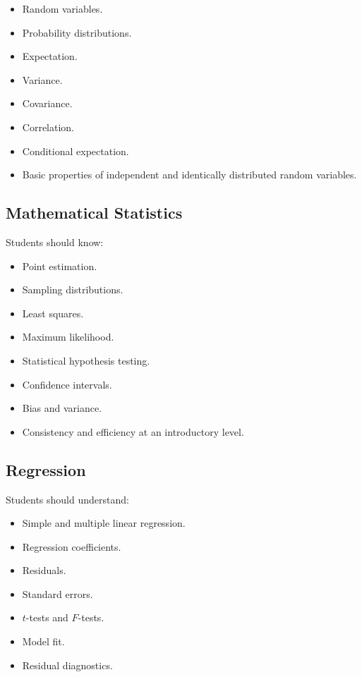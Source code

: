 \documentclass[11pt,a4paper]{article}
\begin{document}
\begin{itemize}
    \item Random variables.
    \item Probability distributions.
    \item Expectation.
    \item Variance.
    \item Covariance.
    \item Correlation.
    \item Conditional expectation.
    \item Basic properties of independent and identically distributed random
          variables.
\end{itemize}

\subsection{Mathematical Statistics}

Students should know:

\begin{itemize}
    \item Point estimation.
    \item Sampling distributions.
    \item Least squares.
    \item Maximum likelihood.
    \item Statistical hypothesis testing.
    \item Confidence intervals.
    \item Bias and variance.
    \item Consistency and efficiency at an introductory level.
\end{itemize}

\subsection{Regression}

Students should understand:

\begin{itemize}
    \item Simple and multiple linear regression.
    \item Regression coefficients.
    \item Residuals.
    \item Standard errors.
    \item $t$-tests and $F$-tests.
    \item Model fit.
    \item Residual diagnostics.
\end{itemize}
\end{document}

